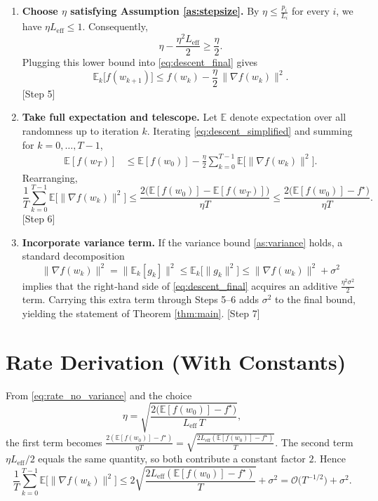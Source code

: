 \documentclass{article}
\begin{document}
\begin{enumerate}
    \item[Step 5.] \textbf{Choose $\eta$ satisfying Assumption \ref{as:stepsize}.}
    By $\eta\le \frac{p_i}{L_i}$ for every $i$, we have $\eta L_{\text{eff}}\le 1$. Consequently,
    \[
        \eta-\frac{\eta^2 L_{\text{eff}}}{2}\ge \frac{\eta}{2}.
    \]
    Plugging this lower bound into \eqref{eq:descent_final} gives
    \begin{equation}
        \mathbb{E}_k\!\bigl[f(w_{k+1})\bigr]
        \le f(w_k) -\frac{\eta}{2}\,\|\nabla f(w_k)\|^2 . \label{eq:descent_simplified}
    \end{equation}
    \hfill[Step 5]

    \item[Step 6.] \textbf{Take full expectation and telescope.}
    Let $\mathbb{E}$ denote expectation over all randomness up to iteration $k$. Iterating \eqref{eq:descent_simplified} and summing for $k=0,\dots ,T-1$,
    \begin{align}
        \mathbb{E}[f(w_T)] 
        &\le \mathbb{E}[f(w_0)] -\frac{\eta}{2}\sum_{k=0}^{T-1}\mathbb{E}\!\bigl[\|\nabla f(w_k)\|^2\bigr] .
    \end{align}
    Rearranging,
    \begin{equation}
        \frac{1}{T}\sum_{k=0}^{T-1}\mathbb{E}\!\bigl[\|\nabla f(w_k)\|^2\bigr]
        \le \frac{2\bigl(\mathbb{E}[f(w_0)]- \mathbb{E}[f(w_T)]\bigr)}{\eta T}
        \le \frac{2\bigl(\mathbb{E}[f(w_0)]-f^\star\bigr)}{\eta T} . \label{eq:rate_no_variance}
    \end{equation}
    \hfill[Step 6]

    \item[Step 7.] \textbf{Incorporate variance term.}
    If the variance bound \ref{as:variance} holds, a standard decomposition
    \[
        \|\nabla f(w_k)\|^2
        =\|\mathbb{E}_k[g_k]\|^2
        \le \mathbb{E}_k\!\bigl[\|g_k\|^2\bigr] 
        \le \|\nabla f(w_k)\|^2 + \sigma^2
    \]
    implies that the right‑hand side of \eqref{eq:descent_final} acquires an additive $\frac{\eta^2\sigma^2}{2}$ term. Carrying this extra term through Steps 5–6 adds $\sigma^2$ to the final bound, yielding the statement of Theorem \ref{thm:main}. \hfill[Step 7]
\end{enumerate}

\section*{Rate Derivation (With Constants)}
From \eqref{eq:rate_no_variance} and the choice
\[
    \eta = \sqrt{\frac{2\bigl(\mathbb{E}[f(w_0)]-f^\star\bigr)}{L_{\text{eff}}\,T}},
\]
the first term becomes $\frac{2(\mathbb{E}[f(w_0)]-f^\star)}{\eta T}= \sqrt{\frac{2L_{\text{eff}}(\mathbb{E}[f(w_0)]-f^\star)}{T}}$.
The second term $\eta L_{\text{eff}}/2$ equals the same quantity, so both contribute a constant factor $2$. Hence
\[
    \frac{1}{T}\sum_{k=0}^{T-1}\mathbb{E}\!\bigl[\|\nabla f(w_k)\|^2\bigr]
    \le 2\sqrt{\frac{2L_{\text{eff}}(\mathbb{E}[f(w_0)]-f^\star)}{T}} + \sigma^2
    =\mathcal{O}\!\bigl(T^{-1/2}\bigr) + \sigma^2 .
\]
\end{document}
